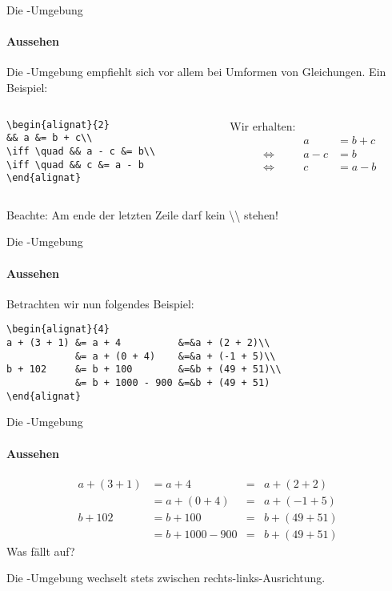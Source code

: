 \begin{frame}[fragile]{Die -Umgebung}
\framesubtitle{Aussehen} 
Die -Umgebung empfiehlt sich vor allem bei Umformen von Gleichungen. Ein Beispiel:
\begin{columns}
\begin{column}{.5\textwidth}
\begin{codeblock}
\begin{verbatim}
\begin{alignat}{2}
&& a &= b + c\\
\iff \quad && a - c &= b\\
\iff \quad && c &= a - b
\end{alignat}
\end{verbatim}
\end{codeblock}
\end{column}

\begin{column}{.48\textwidth}
Wir erhalten:
\begin{alignat}{2}
&& a &= b + c\\
\iff \quad && a - c &= b\\
\iff \quad && c &= a - b
\end{alignat}
\end{column}
\end{columns}
\pause
Beachte: \alert{Am ende der letzten Zeile darf kein \textbackslash\textbackslash{} stehen!}
\end{frame}

\begin{frame}[fragile]{Die -Umgebung}
\framesubtitle{Aussehen}
Betrachten wir nun folgendes Beispiel: 

\begin{codeblock}
\begin{verbatim}
\begin{alignat}{4}
a + (3 + 1) &= a + 4          &=&a + (2 + 2)\\
            &= a + (0 + 4)    &=&a + (-1 + 5)\\
b + 102     &= b + 100        &=&b + (49 + 51)\\
            &= b + 1000 - 900 &=&b + (49 + 51)
\end{alignat}
\end{verbatim}
\end{codeblock}
\end{frame}

\begin{frame}{Die -Umgebung}
\framesubtitle{Aussehen}
\begin{alignat}{4}
a + (3 + 1) &= a + 4          &=&a + (2 + 2)\\
            &= a + (0 + 4)    &=&a + (-1 + 5)\\
b + 102     &= b + 100        &=&b + (49 + 51)\\
            &= b + 1000 - 900 &=&b + (49 + 51)
\end{alignat}
Was fällt auf?

\medskip
\pause
Die -Umgebung wechselt stets zwischen rechts-links-Ausrichtung.
\end{frame}

